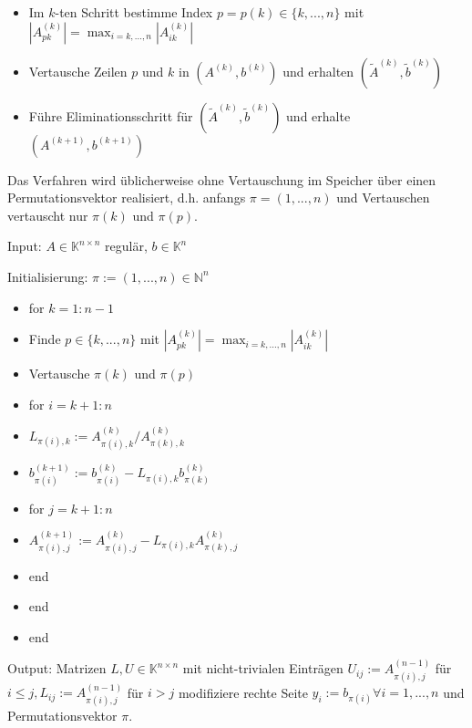 \begin{algorithm}
	\begin{itemize}
		\item Im $k$-ten Schritt bestimme Index $p=p(k) \in \{k, ..., n\}$ mit $|A_{pk}^{(k)}| = \max_{i=k,...,n} |A_{ik}^{(k)}|$
		\item Vertausche Zeilen $p$ und $k$ in $(A^{(k)}, b^{(k)})$ und erhalten $(\tilde{A}^{(k)}, \tilde{b}^{(k)})$
		\item Führe Eliminationsschritt für $(\tilde{A}^{(k)}, \tilde{b}^{(k)})$ und erhalte $(A^{(k+1)}, b^{(k+1)})$
	\end{itemize}
\end{algorithm}

\begin{remark}
	Das Verfahren wird üblicherweise ohne Vertauschung im Speicher über einen Permutationsvektor realisiert, d.h. anfangs $\pi = (1, ..., n)$ und Vertauschen vertauscht nur $\pi(k)$ und $\pi(p)$.
\end{remark}

\begin{algorithm}
	Input: $A \in \mathbb{K}^{n \times n}$ regulär, $b \in \mathbb{K}^n$
	
	Initialisierung: $\pi := (1,...,n) \in \mathbb{N}^n$
	
	\begin{itemize}
		\item for $k=1:n-1$
		\item \hspace{0.5cm} Finde $p \in \{k,...,n\}$ mit $|A_{pk}^{(k)}| = \max_{i=k,...,n}|A_{ik}^{(k)}|$
		\item \hspace{0.5cm} Vertausche $\pi(k)$ und $\pi(p)$
		\item \hspace{0.5cm} for $i=k+1:n$
		\item \hspace{1cm} $L_{\pi(i),k} := A_{\pi(i), k}^{(k)} / A_{\pi(k), k}^{(k)}$
		\item \hspace{1cm} $b_{\pi(i)}^{(k+1)} := b_{\pi(i)}^{(k)} - L_{\pi(i), k} b_{\pi(k)}^{(k)}$
		\item \hspace{1cm} for $j=k+1:n$
		\item \hspace{1.5cm} $A_{\pi(i),j}^{(k+1)} := A_{\pi(i),j}^{(k)} - L_{\pi(i),k} A_{\pi(k),j}^{(k)}$
		\item \hspace{1cm} end
		\item \hspace{0.5cm} end
		\item end
	\end{itemize}
	
	Output: Matrizen $L,U \in \mathbb{K}^{n\times n}$ mit nicht-trivialen Einträgen $U_{ij} := A_{\pi(i),j}^{(n-1)}$ für $i \leq j, L_{ij} := A_{\pi(i),j}^{(n-1)}$ für $i > j$ modifiziere rechte Seite $y_i := b_{\pi(i)} \forall i=1, ..., n$ und Permutationsvektor $\pi$.
\end{algorithm}

